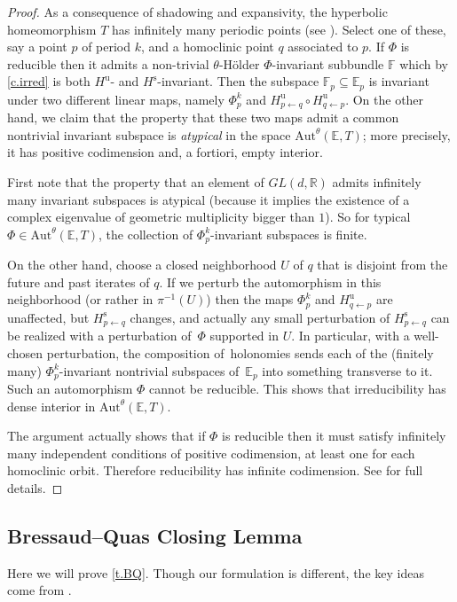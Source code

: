 \documentclass[10pt]{amsart}
\theoremstyle{plain}
\theoremstyle{definition}
\newcommand{\RR}{\mathbb{R}}
\newcommand{\EE}{\mathbb{E}}
\newcommand{\FF}{\mathbb{F}}
\newcommand{\GL}{\mathit{GL}}
\newcommand{\uu}{\mathrm{u}}
\renewcommand{\ss}{\mathrm{s}}
\newcommand{\Aut}{\mathrm{Aut}}
\begin{document}
\begin{proof}
As a consequence of shadowing and expansivity, the hyperbolic homeomorphism $T$ has infinitely many periodic points (see \eg \cite[p.\,228]{Akin}). Select one of these, say a point $p$ of period $k$, and a homoclinic point $q$ associated to $p$. If $\Phi$ is reducible then it admits a non-trivial $\theta$-Hölder $\Phi$-invariant subbundle $\FF$ which by \cref{c.irred} is both $H^\uu$- and $H^\ss$-invariant.
Then the subspace $\FF_p \subseteq \EE_p$ is invariant under two different linear maps, namely
$\Phi^k_p$ and $H^\uu_{p \gets q} \circ H^\uu_{q \gets p}$.
On the other hand, we claim that the property that these two maps admit a common nontrivial invariant subspace is \emph{atypical} in the space $\Aut^\theta(\EE,T)$; more precisely, it has positive codimension and, a fortiori, empty interior.

First note that the property that an element of $\GL(d,\RR)$ admits infinitely many invariant subspaces is atypical (because it implies the existence of a complex eigenvalue of geometric multiplicity bigger than $1$). So for typical $\Phi \in \Aut^\theta(\EE,T)$, the collection of $\Phi^k_p$-invariant subspaces is finite.

On the other hand, choose a closed neighborhood $U$ of $q$ that is disjoint from the future and past iterates of $q$.
If we perturb the automorphism in this neighborhood (or rather in $\pi^{-1}(U)$) then the maps $\Phi^k_p$ and $H^\uu_{q \gets p}$ are unaffected, but $H^\ss_{p \gets q}$ changes, and actually any small perturbation of $H^\ss_{p \gets q}$ can be realized with a perturbation of~$\Phi$ supported in $U$.
In particular, with a well-chosen perturbation, the composition of~holonomies sends each of the (finitely many) $\Phi^k_p$-invariant nontrivial subspaces of~$\EE_p$ into something transverse to it. Such an automorphism $\Phi$ cannot be reducible.
This shows that irreducibility has dense interior in $\Aut^\theta(\EE,T)$.

The argument actually shows that if $\Phi$ is reducible then it must satisfy infinitely many independent conditions of positive codimension, at least one for each homoclinic orbit.
Therefore reducibility has infinite codimension. See \cite[\S4]{Viana} for full details.
\end{proof}

\subsection{Bressaud--Quas Closing Lemma}\label{ss.BQ}
Here we will prove \cref{t.BQ}.
Though our formulation is different, the key ideas come from \cite{BQuas}.
\end{document}
